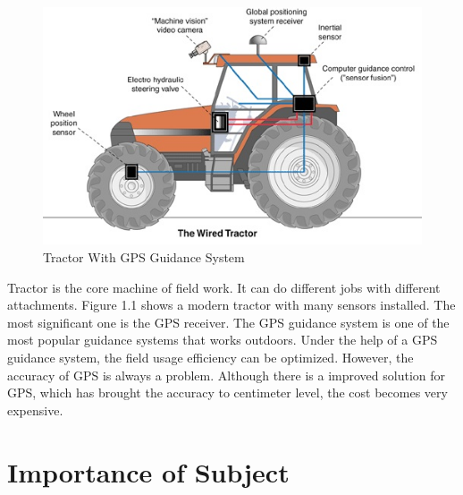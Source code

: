 \documentclass[letterpaper,12pt,oneside]{book}
\begin{document}
		\begin{figure}[ht!]
			\begin{center}
				\includegraphics[scale = 1]{GPStractor.jpg}
				\caption{Tractor With GPS Guidance System}
			\end{center}
		\end{figure}
		Tractor is the core machine of field work. It can do different jobs with different attachments. Figure  1.1 shows a modern tractor with many sensors installed. The most significant one is the GPS receiver. The GPS guidance system is one of the most popular guidance systems that works outdoors. Under the help of a GPS guidance system, the field usage efficiency can be optimized. However, the accuracy of GPS is always a problem. Although there is a improved solution for GPS, which has brought the accuracy to centimeter level, the cost becomes very expensive.
		
		
		
		\section{Importance of Subject}
		
\end{document}
